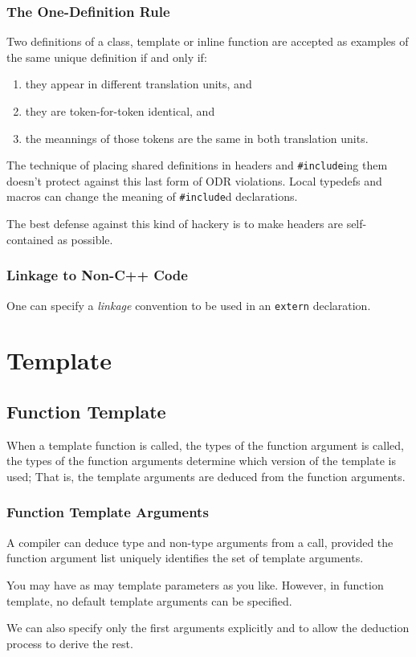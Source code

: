 \documentclass[a4paper,12pt]{book}
\begin{document}
\subsection{The One-Definition Rule}
Two definitions of a class, template or inline function are accepted as examples of the same unique definition if and only if:
\begin{enumerate}
\item they appear in different translation units, and
\item they are token-for-token identical, and
\item the meannings of those tokens are the same in both translation units.
\end{enumerate}
The technique of placing shared definitions in headers and \verb|#include|ing them doesn't protect against this last form of ODR violations. Local typedefs and macros can change the meaning of \verb|#include|d declarations.

The best defense against this kind of hackery is to make headers are self-contained as possible.
\subsection{Linkage to Non-C++ Code}
One can specify a \emph{linkage} convention to be used in an \verb|extern| declaration. 

\chapter{Template}
\section{Function Template}
When a template function is called, the types of the function argument is called, the types of the function arguments determine which version of the template is used; That is, the template arguments are deduced from the function arguments. 
\subsection{Function Template Arguments}
A compiler can deduce type and non-type arguments from a call, provided the function argument list uniquely identifies the set of template arguments. 

You may have as may template parameters as you like. However, in function template, no default template arguments can be specified.

We can also specify only the first arguments explicitly and to allow the deduction process to derive the rest.
\end{document}

